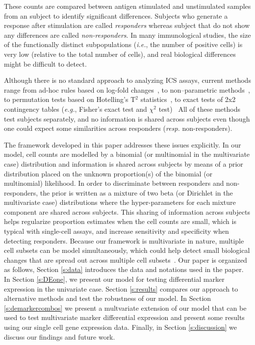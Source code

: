 \documentclass[useAMS,referee,usenatbib]{biom}
\begin{document}
These counts are compared between antigen stimulated and unstimulated samples from an subject to identify significant differences. Subjects who generate a response after stimulation are called \textit{responders} whereas subject that do not show any differences are called \textit{non-responders}. 
In many immunological studies, the size of the functionally distinct subpopulations (\textit{i.e.}, the number of positive cells) is very low (relative to the total number of cells), and real biological differences might be difficult to detect. 

Although there is no standard approach to analyzing ICS assays, current methods range from ad-hoc rules based on log-fold changes~\citep{Trigona:2003}, to non--parametric methods~\citep{Sinclair:2004hs}, to permutation tests based on Hotelling's T$^2$ statistics~\citep{Nason:2006dx}, to exact tests of 2x2 contingency tables (\textit{e.g.}, Fisher's exact test and $\chi^2$ test)~\citep{Horton:2007tsa,Proschan:2009ks,Peiperl:2010ej,Nason:2006dx}
All of these methods test subjects separately, and no information is shared across subjects even though one could expect some similarities across responders (\textit{resp.} non-responders). %

The framework developed in this paper addresses these issues explicitly. In our model, cell counts are modelled by a binomial (or multinomial in the multivariate case) distribution and information is shared across subjects by means of a prior distribution placed on the unknown proportion(s) of the binomial (or multinomial) likelihood. 
In order to discriminate between responders and non-responders, the prior is written as a mixture of two beta (or Dirichlet in the multivariate case) distributions where the hyper-parameters for each mixture component are shared across subjects. 
This sharing of information across subjects helps regularize proportion estimates when the cell counts are small, which is typical with single-cell assays, and increase sensitivity and specificity when detecting responders. 
Because our framework is multivariate in nature, multiple cell subsets can be model simultaneously, which could help detect small biological changes that are spread out across multiple cell subsets~\citep{Nason:2006dx}. Our paper is organized as follows, Section \ref{s:data} introduces the data and notations used in the paper. In Section \ref{s:DEone}, we present our model for testing differential marker expression in the univariate case. Section \ref{s:results} compares our approach to alternative methods and test the robustness of our model. In Section \ref{s:demarkercombos} we present a multvariate extension of our model that can be used to test multivariate marker differential expression and present some results using our single cell gene expression data. Finally, in Section \ref{s:discussion} we discuss our findings and future work.
\end{document}

